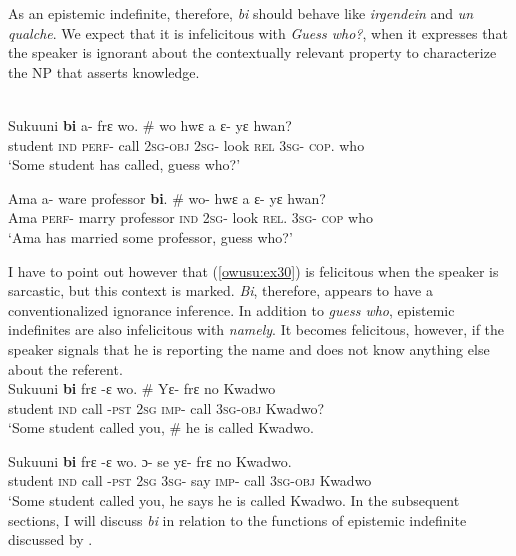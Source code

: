 \documentclass[output=paper,modfonts,nonflat,draftmode]{langsci/langscibook}
\begin{document}
 As an epistemic indefinite, therefore, \emph{bi} should behave like \emph{irgendein} and \emph{un qualche}. We expect that it is infelicitous with \emph{Guess who?}, when it expresses that the speaker is ignorant about the contextually relevant property to characterize the NP that asserts knowledge.  


\ea {}\\
 \ea\label{owusu:ex30}
 \gll Sukuuni \textbf{bi} a- frε wo. \# wo hwε a ε- yε hwan? \\
     student \textsc{ind} \textsc{perf}- call       \textsc{2sg}-\textsc{obj} {} \textsc{2sg}- look  \textsc{rel} \textsc{3sg}- \textsc{cop}. who \\
\glt `Some student has called, guess who?'

\ex \label{owusu:ex31}
\gll  Ama a- ware professor \textbf{bi}. \# wo- hwε a ε- yε hwan?\\
Ama \textsc{perf}- marry professor \textsc{ind} {} \textsc{2sg}- look  \textsc{rel}. \textsc{3sg}- \textsc{cop} who\\
\glt `Ama has married some professor, guess who?'
\z\z 

I have to point out however that (\ref{owusu:ex30}) is felicitous when the speaker is sarcastic, but this context is marked. \emph{Bi}, therefore, appears to have a conventionalized ignorance inference. In addition to \emph{guess who}, epistemic indefinites are also infelicitous with \emph{namely}. It becomes felicitous, however, if the speaker signals that he is reporting the name and does not know anything else about the referent. 
\ea {}\\
\ea\label{owusu:ex32}
 \gll Sukuuni \textbf{bi} frε -ε wo. \# Yε- frε no Kwadwo\\
student \textsc{ind} call -\textsc{pst}  \textsc{2sg} {} \textsc{imp}- call  \textsc{3sg}-\textsc{obj} Kwadwo? \\
    
\glt `Some student called you, \# he is called Kwadwo.

\ex \label{owusu:ex33}
\gll  Sukuuni \textbf{bi} frε -ε wo. ɔ- se yε- frε no Kwadwo.\\
 student \textsc{ind} call -\textsc{pst}  \textsc{2sg} \textsc{3sg}- say \textsc{imp}- call  \textsc{3sg}-\textsc{obj} Kwadwo\\
\glt `Some student called you, he says he is called Kwadwo.
\z\z In the subsequent sections, I will discuss \emph{bi} in relation to the functions of epistemic indefinite discussed by  \citet{AloniPort2015}.
\end{document}
